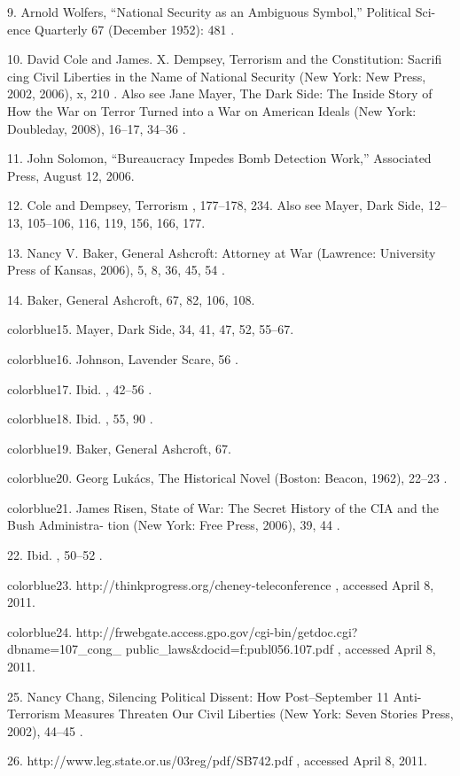 	{\color{blue}9}. Arnold Wolfers, “National Security as an Ambiguous Symbol,” Political Sci- ence Quarterly 67 (December 1952): 481 .


	{\color{blue}10}. David Cole and James. X. Dempsey, Terrorism and the Constitution: Sacrifi cing Civil Liberties in the Name of National Security (New York: New Press, 2002, 2006), x, 210 . Also see Jane Mayer, The Dark Side: The Inside Story of How the War on Terror Turned into a War on American Ideals (New York: Doubleday, 2008), 16–17, 34–36 .


	{\color{blue}11}. John Solomon, “Bureaucracy Impedes Bomb Detection Work,” Associated Press, August 12, 2006.


	{\color{blue}12}. Cole and Dempsey, Terrorism , 177–178, 234. Also see Mayer, Dark Side, 12–13, 105–106, 116, 119, 156, 166, 177.


	{\color{blue}13}. Nancy V. Baker, General Ashcroft: Attorney at War (Lawrence: University Press of Kansas, 2006), 5, 8, 36, 45, 54 .


	{\color{blue}14}. Baker, General Ashcroft, 67, 82, 106, 108.


	{color{blue}15}. Mayer, Dark Side, 34, 41, 47, 52, 55–67.


	{color{blue}16}. Johnson, Lavender Scare, 56 .


	{color{blue}17}. Ibid. , 42–56 .


	{color{blue}18}. Ibid. , 55, 90 .


	{color{blue}19}. Baker, General Ashcroft, 67.


	{color{blue}20}. Georg Lukács, The Historical Novel (Boston: Beacon, 1962), 22–23 .


	{color{blue}21}. James Risen, State of War: The Secret History of the CIA and the Bush Administra- tion (New York: Free Press, 2006), 39, 44 .


	{\color{blue}22}. Ibid. , 50–52 .


	{color{blue}23}. http://thinkprogress.org/cheney-teleconference , accessed April 8, 2011.


	{color{blue}24}. http://frwebgate.access.gpo.gov/cgi-bin/getdoc.cgi?dbname=107_cong_ public_laws&docid=f:publ056.107.pdf , accessed April 8, 2011.


	{\color{blue}25}. Nancy Chang, Silencing Political Dissent: How Post–September 11 Anti-Terrorism Measures Threaten Our Civil Liberties (New York: Seven Stories Press, 2002), 44–45 .


	{\color{blue}26}. http://www.leg.state.or.us/03reg/pdf/SB742.pdf , accessed April 8, 2011.


